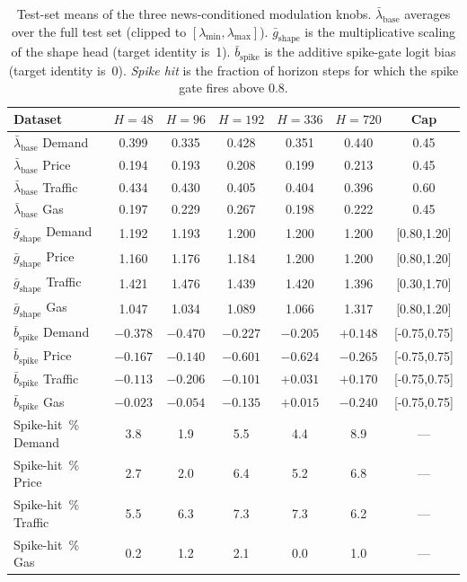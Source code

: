 \documentclass{article}
\begin{document}
\begin{table}[h]
\centering
\caption{Test-set means of the three news-conditioned modulation knobs. \emph{$\bar\lambda_{\text{base}}$} averages over the full test set (clipped to $[\lambda_{\min},\lambda_{\max}]$). \emph{$\bar g_{\text{shape}}$} is the multiplicative scaling of the shape head (target identity is~1). \emph{$\bar b_{\text{spike}}$} is the additive spike-gate logit bias (target identity is~0). \emph{Spike hit} is the fraction of horizon steps for which the spike gate fires above $0.8$.}
\label{tab:knob_means}
\scriptsize
\setlength{\tabcolsep}{5pt}
\renewcommand{\arraystretch}{1.05}
\begin{tabular}{lccccc|c}
\toprule
\textbf{Dataset} & $H{=}48$ & $H{=}96$ & $H{=}192$ & $H{=}336$ & $H{=}720$ & \textbf{Cap} \\
\midrule
$\bar\lambda_{\text{base}}$  Demand & 0.399 & 0.335 & 0.428 & 0.351 & 0.440 & 0.45 \\
$\bar\lambda_{\text{base}}$  Price  & 0.194 & 0.193 & 0.208 & 0.199 & 0.213 & 0.45 \\
$\bar\lambda_{\text{base}}$  Traffic& 0.434 & 0.430 & 0.405 & 0.404 & 0.396 & 0.60 \\
$\bar\lambda_{\text{base}}$  Gas    & 0.197 & 0.229 & 0.267 & 0.198 & 0.222 & 0.45 \\
\midrule
$\bar g_{\text{shape}}$  Demand  & 1.192 & 1.193 & 1.200 & 1.200 & 1.200 & [0.80,1.20] \\
$\bar g_{\text{shape}}$  Price   & 1.160 & 1.176 & 1.184 & 1.200 & 1.200 & [0.80,1.20] \\
$\bar g_{\text{shape}}$  Traffic & 1.421 & 1.476 & 1.439 & 1.420 & 1.396 & [0.30,1.70] \\
$\bar g_{\text{shape}}$  Gas     & 1.047 & 1.034 & 1.089 & 1.066 & 1.317 & [0.80,1.20] \\
\midrule
$\bar b_{\text{spike}}$  Demand  & $-0.378$ & $-0.470$ & $-0.227$ & $-0.205$ & $+0.148$ & [-0.75,0.75] \\
$\bar b_{\text{spike}}$  Price   & $-0.167$ & $-0.140$ & $-0.601$ & $-0.624$ & $-0.265$ & [-0.75,0.75] \\
$\bar b_{\text{spike}}$  Traffic & $-0.113$ & $-0.206$ & $-0.101$ & $+0.031$ & $+0.170$ & [-0.75,0.75] \\
$\bar b_{\text{spike}}$  Gas     & $-0.023$ & $-0.054$ & $-0.135$ & $+0.015$ & $-0.240$ & [-0.75,0.75] \\
\midrule
Spike-hit~\%  Demand  & 3.8 & 1.9 & 5.5 & 4.4 & 8.9 & --- \\
Spike-hit~\%  Price   & 2.7 & 2.0 & 6.4 & 5.2 & 6.8 & --- \\
Spike-hit~\%  Traffic & 5.5 & 6.3 & 7.3 & 7.3 & 6.2 & --- \\
Spike-hit~\%  Gas     & 0.2 & 1.2 & 2.1 & 0.0 & 1.0 & --- \\
\bottomrule
\end{tabular}
\end{table}
\end{document}
